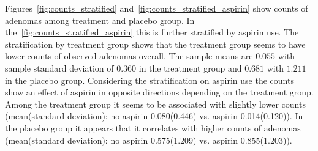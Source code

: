 \documentclass[paper=a4, fontsize=11pt]{scrartcl} %
\numberwithin{equation}{section} %
\numberwithin{figure}{section} %
\numberwithin{table}{section} %
\begin{document}


Figures~\ref{fig:counts_stratified} and~\ref{fig:counts_stratified_aspirin} show counts of adenomas among treatment and placebo group. In the~\ref{fig:counts_stratified_aspirin} this is further stratified by aspirin use. The stratification by treatment group shows that the treatment group seems to have lower counts of observed adenomas overall. The sample means are $0.055$ with sample standard deviation of $0.360$ in the treatment group and $0.681$ with $1.211$ in the placebo group. Considering the stratification on aspirin use the counts show an effect of aspirin in opposite directions depending on the treatment group. Among the treatment group it seems to be associated with slightly lower counts (mean(standard deviation): no aspirin 0.080(0.446) vs. aspirin 0.014(0.120)). In the placebo group it appears that it correlates with higher counts of adenomas (mean(standard deviation): no aspirin 0.575(1.209) vs. aspirin 0.855(1.203)).
\end{document}
